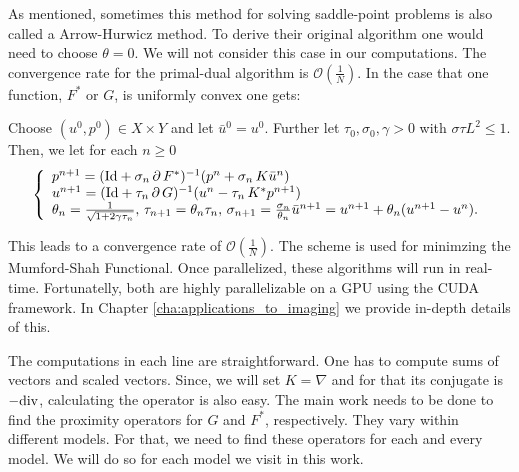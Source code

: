     As mentioned, sometimes this method for solving saddle-point problems is also called a Arrow-Hurwicz method. To derive their original algorithm one would need to choose $\theta = 0$. We will not consider this case in our computations. The convergence rate for the primal-dual algorithm is $\mathcal{O}(\frac{1}{N})$. In the case that one function, $F^{\ast}$ or $G$, is uniformly convex one gets:

    \begin{algorithm}
    \label{alg:f_star_or_g_uniformly_convex}
        Choose $(u^{0}, p^{0}) \in X \times Y$ and let $\bar{u}^{0} = u^{0}$. Further let $\tau_{0}, \sigma_{0}, \gamma > 0$ with $\sigma\tau L^{2} \le 1$. Then, we let for each $n \ge 0$
            \begin{equation}
                \left\{ 
                    \begin{array}{l l}
                        p^{n+1} = (\textnormal{Id} + \sigma_{n}\,\partial\,F^{\ast})^{-1}(p^{n} + \sigma_{n}\,K\bar{u}^{n}) \\
                        u^{n+1} = (\textnormal{Id} + \tau_{n}\,\partial\,G)^{-1}(u^{n} - \tau_{n}\,K^{\ast}p^{n+1}) \\
                        \theta_{n} = \frac{1}{\sqrt{1 + 2\gamma\tau_{n}}}, \, \tau_{n+1} = \theta_{n}\tau_{n}, \, \sigma_{n+1} = \frac{\sigma_{n}}{\theta_{n}}
                        \bar{u}^{n+1} = u^{n+1} + \theta_{n} (u^{n+1} - u^{n}).
                    \end{array}
                \right.
            \label{eq:f_star_or_g_uniformly_convex}
            \end{equation}
    \end{algorithm}

    This leads to a convergence rate of $\mathcal{O}(\frac{1}{N})$. The scheme is used for minimzing the Mumford-Shah Functional. Once parallelized, these algorithms will run in real-time. Fortunatelly, both are highly parallelizable on a GPU using the CUDA framework. In Chapter \ref{cha:applications_to_imaging} we provide in-depth details of this.

    The computations in each line are straightforward. One has to compute sums of vectors and scaled vectors. Since, we will set $K = \nabla$ and for that its conjugate is $-\textnormal{div}$, calculating the operator is also easy. The main work needs to be done to find the proximity operators for $G$ and $F^{\ast}$, respectively. They vary within different models. For that, we need to find these operators for each and every model. We will do so for each model we visit in this work.

